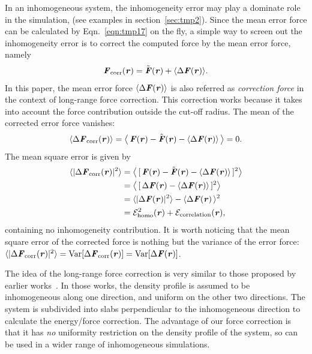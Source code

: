 \documentclass[aps,pre,preprint]{revtex4}
\renewcommand{\v}[1]{\textbf{\textit{#1}}}
\begin{document}
In an inhomogeneous system, the inhomogeneity error may play a
dominate role in the simulation, (see examples in section~\ref{sec:tmp2}).
Since the mean error force can be calculated
by Eqn.~\eqref{eqn:tmp17} on the fly, a simple way to screen out the
inhomogeneity error is to correct the computed force by the mean error
force, namely
\begin{align}\label{eqn:define-fcorr}
  \v F_{\textrm{corr}}(\v r) = \tilde{\v F}(\v r) + \langle\Delta\v F(\v r)\rangle.
\end{align}
In this paper, the mean error force $\langle\Delta\v F(\v r)\rangle$
is also referred as \emph{correction force} in the context of
long-range force correction. This correction works because it takes
into account the force contribution outside the cut-off radius. The mean of
the corrected error force vanishes:
\begin{align}\label{eqn:mean-fcorr}
  \langle\Delta\v F_{\textrm{corr}}(\v r)\rangle
   =
  \big\langle\,
  \v F(\v r) - \tilde{\v F}(\v r) - \langle\Delta\v F(\v r)\rangle\,
  \big\rangle = 0.
\end{align}
The mean square error is given by
\begin{align} \nonumber
  \langle\vert\Delta\v F_{\textrm{corr}}(\v r)\vert^2\rangle
  & =
  \big\langle\,
  [\,\v F(\v r) - \tilde{\v F}(\v r) - \langle\Delta\v F(\v r)\rangle\,]^2
  \big\rangle \\\nonumber
  & =
  \big\langle\,
  [\,\Delta\v F(\v r) - \langle\Delta\v F(\v r)\rangle\,]^2
  \big\rangle \\\nonumber
  & =
  \langle\vert\Delta\v F(\v r)\vert^2\rangle -
  \langle\Delta\v F(\v r)\,\rangle^2 \\
  & =
  \mathcal E^2_{\textrm{homo}}(\v r) +
  \mathcal E_{\textrm{correlation}}(\v r),
\end{align}
containing no inhomogeneity contribution.  It is worth noticing that the mean
square error of the corrected force is nothing but the variance of the
error force: $\langle\vert\Delta\v
F_{\textrm{corr}}(\v r)\vert^2\rangle = \textrm{Var}[\Delta\v
F_{\textrm{corr}}(\v r)] = \textrm{Var}[\Delta\v F(\v r)]$.

The idea of the long-range force correction is very similar to those
proposed by earlier works~\cite{guo1997long, mecke1997molecular,
  janecek2006long, shen2007comparative}. In those works, the density
profile is assumed to be inhomogeneous along one direction, and uniform
on the other two directions.
The
system is subdivided into slabs perpendicular to the inhomogeneous direction to
calculate the energy/force correction. The advantage of our force
correction is that it has \emph{no} uniformity restriction on the density
profile of the system, so can be used in a wider range of
inhomogeneous simulations.
\end{document}
